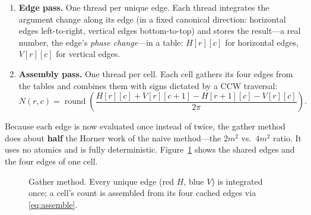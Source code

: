 \documentclass[11pt]{article}
\begin{document}
\begin{enumerate}
  \item \textbf{Edge pass.} One thread per unique edge. Each thread integrates
    the argument change along its edge (in a fixed canonical direction:
    horizontal edges left-to-right, vertical edges bottom-to-top) and stores the
    result---a real number, the edge's \emph{phase change}---in a table:
    $H[r][c]$ for horizontal edges, $V[r][c]$ for vertical edges.
  \item \textbf{Assembly pass.} One thread per cell. Each cell gathers its four
    edges from the tables and combines them with signs dictated by a CCW
    traversal:
    \begin{equation}
      N(r,c) = \operatorname{round}\!\left(
        \frac{H[r][c] + V[r][c{+}1] - H[r{+}1][c] - V[r][c]}{2\pi}\right).
      \label{eq:assemble}
    \end{equation}
\end{enumerate}
Because each edge is now evaluated once instead of twice, the gather method does
about \textbf{half} the Horner work of the naive method---the $2m^2$ vs.\ $4m^2$
ratio. It uses no atomics and is fully deterministic.
Figure~\ref{fig:gather} shows the shared edges and the four edges of one cell.

\begin{figure}[h]
\centering
{}
\caption{Gather method. Every unique edge (red $H$, blue $V$) is integrated once;
a cell's count is assembled from its four cached edges via \eqref{eq:assemble}.}
\label{fig:gather}
\end{figure}
\end{document}
